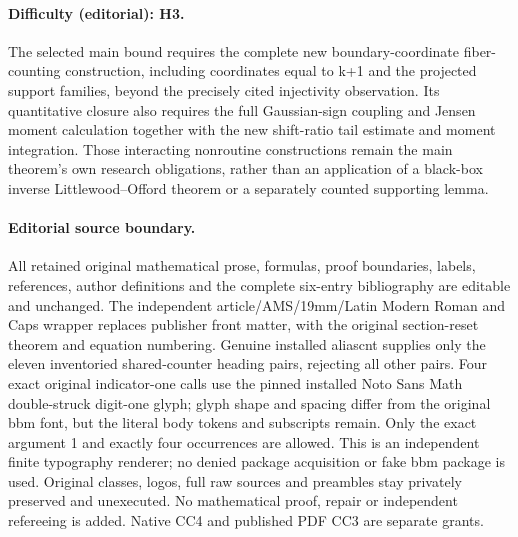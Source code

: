 \documentclass[11pt]{article}
\numberwithin{equation}{section}
\theoremstyle{definition}
\theoremstyle{remark}
\begin{document}
\paragraph{Difficulty (editorial): H3.} The selected main bound requires the complete new boundary-coordinate fiber-counting construction, including coordinates equal to k+1 and the projected support families, beyond the precisely cited injectivity observation. Its quantitative closure also requires the full Gaussian-sign coupling and Jensen moment calculation together with the new shift-ratio tail estimate and moment integration. Those interacting nonroutine constructions remain the main theorem’s own research obligations, rather than an application of a black-box inverse Littlewood–Offord theorem or a separately counted supporting lemma.
\paragraph{Editorial source boundary.} All retained original mathematical prose, formulas, proof boundaries, labels, references, author definitions and the complete six-entry bibliography are editable and unchanged. The independent article/AMS/19mm/Latin Modern Roman and Caps wrapper replaces publisher front matter, with the original section-reset theorem and equation numbering. Genuine installed aliascnt supplies only the eleven inventoried shared-counter heading pairs, rejecting all other pairs. Four exact original indicator-one calls use the pinned installed Noto Sans Math double-struck digit-one glyph; glyph shape and spacing differ from the original bbm font, but the literal body tokens and subscripts remain. Only the exact argument 1 and exactly four occurrences are allowed. This is an independent finite typography renderer; no denied package acquisition or fake bbm package is used. Original classes, logos, full raw sources and preambles stay privately preserved and unexecuted. No mathematical proof, repair or independent refereeing is added. Native CC4 and published PDF CC3 are separate grants.
\clearpage
\end{document}
